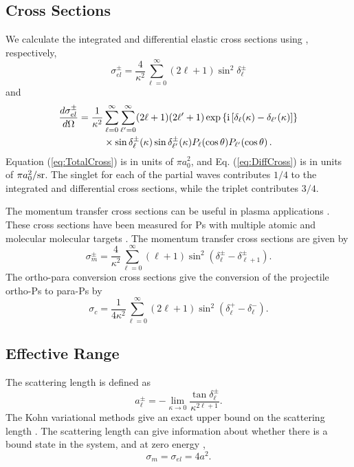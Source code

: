 \documentclass[reprint,showpacs,preprintnumbers,amsmath,amssymb,pra,aps]{revtex4-1}
\newcommand{\ii}{{\rm{i}}}
\begin{document}
\subsection{Cross Sections}
We calculate the integrated and differential elastic cross sections using \cite{Bransden2003}, respectively,
\begin{equation}
\label{eq:TotalCross}
\sigma_{el}^\pm = \frac{4}{\kappa^2} \sum_{\ell=0}^\infty (2\ell+1) \sin^2 \delta_\ell^\pm
\end{equation}
and
\begin{align}
\label{eq:DiffCross}
\nonumber \frac{d\sigma_{el}^\pm}{d\Omega} = \frac{1}{\kappa^2} & \sum_{\ell=0}^\infty \sum_{\ell^\prime=0}^\infty (2\ell+1)(2\ell^\prime+1) \exp\left\{\ii \left[\delta_\ell(\kappa) - \delta_{\ell^\prime}(\kappa) \right] \right\} \\
& \times \sin\delta_\ell^\pm(\kappa) \sin\delta_{\ell^\prime}^\pm(\kappa) P_\ell(\cos\theta) P_{\ell^\prime}(\cos\theta)\,.
\end{align}
Equation (\ref{eq:TotalCross}) is in units of $\pi a_0^2$, and Eq. (\ref{eq:DiffCross}) is in units of $\pi a_0^2 / \rm{sr}$. The singlet for each of the partial waves contributes $1/4$ to the integrated and differential cross sections, while the triplet contributes $3/4$.

The momentum transfer cross sections can be useful in plasma applications \cite{Wang2014, McEachran2014}. These cross sections have been measured for Ps with multiple atomic and molecular molecular targets \cite{Nagashima1998,Saito2003}. The momentum transfer cross sections are given by \cite{Bransden2003}
\begin{equation}
\label{eq:MomentumCross}
\sigma_{m}^\pm = \frac{4}{\kappa^2} \sum_{\ell=0}^\infty (\ell+1) \sin^2 (\delta_\ell^\pm - \delta_{\ell+1}^\pm) .
\end{equation}
The ortho-para conversion cross sections give the conversion of the projectile ortho-Ps to para-Ps by \cite{Hara1975}
\begin{equation}
\label{eq:OrthoParaCross}
\sigma_{c} = \frac{1}{4 \kappa^2} \sum_{\ell=0}^\infty (2 \ell+1) \sin^2 (\delta_\ell^+ - \delta_\ell^-).
\end{equation}


\subsection{Effective Range}

The scattering length is defined as \cite{Bransden2003}
\begin{equation}
\label{eq:ScatLen}
a_\ell^\pm = -\lim_{\kappa \to 0} \frac{\tan{\delta_\ell^\pm}}{\kappa^{2\ell+1}}.
\end{equation}
The Kohn variational methods give an exact upper bound on the scattering length \cite{Joachain1979}. The scattering length can give information about whether there is a bound state in the system, and at zero energy \cite{Buckman1989},
\begin{equation}
\label{eq:ScatLenCross}
\sigma_m = \sigma_{el} = 4 a^2 .
\end{equation}
\end{document}
